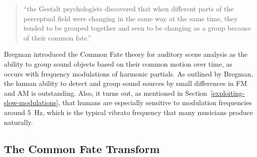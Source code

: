 \begin{quote}
``the Gestalt psychologists discovered that when different parts of the perceptual field were changing in the same way at the same time, they tended to be grouped together and seen to be changing as a group because of their common fate.'' 
\end{quote}

Bregman introduced the Common Fate theory for auditory scene analysis as the ability to group sound objects based on their common motion over time, as occurs with frequency modulations of harmonic partials.
As outlined by Bregman, the human ability to detect and group sound sources by small differences in \acs{FM} and \acs{AM} is outstanding.
Also, it turns out, as mentioned in Section~\ref{exploiting-slow-modulations}, that humans are especially sensitive to modulation frequencies around \SI{5}{\hertz}, which is the typical vibrato frequency that many musicians produce naturally.

\subsection{The Common Fate Transform}
\label{sub:CFT}

